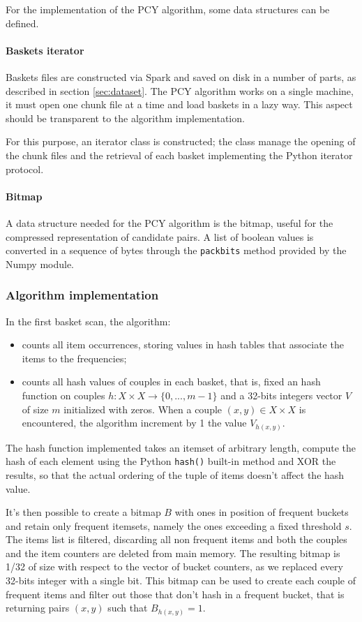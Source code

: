 \documentclass{article}
\begin{document}
For the implementation of the PCY algorithm, some data structures can be defined. 

\paragraph{Baskets iterator}

Baskets files are constructed via Spark and saved on disk in a number of parts, as described in section \ref{sec:dataset}. The PCY algorithm works on a single machine, it must open one chunk file at a time and load baskets in a lazy way. This aspect should be transparent to the algorithm implementation. 

For this purpose, an iterator class is constructed; the class manage the opening of the chunk files and the retrieval of each basket implementing the Python iterator protocol.

\paragraph{Bitmap} 
A data structure needed for the PCY algorithm is the bitmap, useful for the compressed representation of candidate pairs. A list of boolean values is converted in a sequence of bytes through the \texttt{packbits} method provided by the Numpy module.

\subsubsection{Algorithm implementation}

In the first basket scan, the algorithm:
\begin{itemize}
	\item counts all item occurrences, storing values in hash tables that associate the items to the frequencies;
	\item counts all hash values of couples in each basket, that is, fixed an hash function on couples $h: X \times X \rightarrow \{0, ..., m-1\}$ and a 32-bits integers vector $V$ of size $m$ initialized with zeros. When a couple $(x, y)\in X\times X$ is encountered, the algorithm increment by 1 the value $V_{h(x,y)}$.
\end{itemize}
The hash function implemented takes an itemset of arbitrary length, compute the hash of each element using the Python \texttt{hash()} built-in method and XOR the results, so that the actual ordering of the tuple of items doesn't affect the hash value.

It's then possible to create a bitmap $B$ with ones in position of frequent buckets and retain only frequent itemsets, namely the ones exceeding a fixed threshold $s$. The items list is filtered, discarding all non frequent items and both the couples and the item counters are deleted from main memory.
The resulting bitmap is 1/32 of size with respect to the vector of bucket counters, as we replaced  every 32-bits integer with a single bit. This bitmap can be used to create each couple of frequent items and filter out those that don't hash in a frequent bucket, that is returning pairs $(x, y)$ such that $B_{h(x, y)} = 1$.
\end{document}

